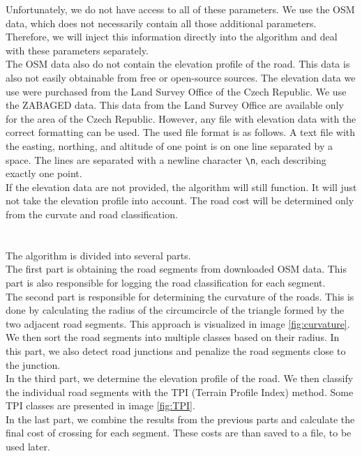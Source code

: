             Unfortunately, we do not have access to all of these parameters. We use the OSM data, which does not necessarily contain all those additional parameters. Therefore, we will inject this information directly into the algorithm and deal with these parameters separately.\\
            The OSM data also do not contain the elevation profile of the road. This data is also not easily obtainable from free or open-source sources. The elevation data we use were purchased from the Land Survey Office of the Czech Republic. We use the ZABAGED\cite{ZABAGED} data. This data from the Land Survey Office are available only for the area of the Czech Republic. However, any file with elevation data with the correct formatting can be used. The used file format is as follows. A text file with the easting, northing, and altitude of one point is on one line separated by a space. The lines are separated with a newline character \texttt{\textbackslash n}, each describing exactly one point.\\
            If the elevation data are not provided, the algorithm will still function. It will just not take the elevation profile into account. The road cost will be determined only from the curvate and road classification.\\\\
        \\
            The algorithm is divided into several parts.\\
            The first part is obtaining the road segments from downloaded OSM data. This part is also responsible for logging the road classification for each segment.\\
            The second part is responsible for determining the curvature of the roads. This is done by calculating the radius of the circumcircle of the triangle formed by the two adjacent road segments. This approach is visualized in image \ref{fig:curvature}. We then sort the road segments into multiple classes based on their radius. In this part, we also detect road junctions and penalize the road segments close to the junction.\\
            In the third part, we determine the elevation profile of the road. We then classify the individual road segments with the TPI (Terrain Profile Index) method. Some TPI classes are presented in image \ref{fig:TPI}.\\
            In the last part, we combine the results from the previous parts and calculate the final cost of crossing for each segment. These costs are than saved to a file, to be used later.\\
